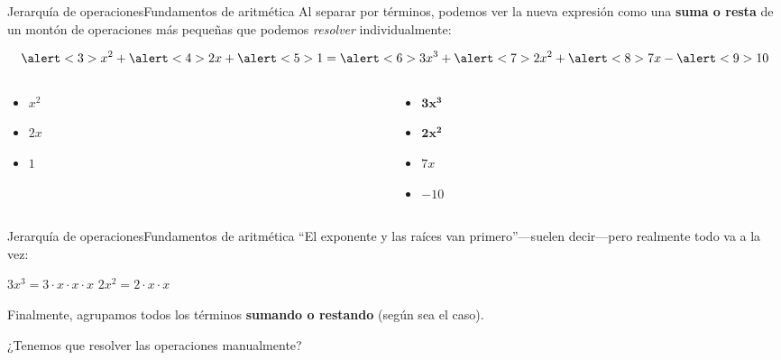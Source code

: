 \documentclass[spanish]{beamer}
\begin{document}
\begin{frame}{Jerarquía de operaciones}{Fundamentos de aritmética}
    Al separar por \alert{términos}, podemos ver la nueva expresión como una \textbf{\color{magenta} suma o resta} de un montón de operaciones más pequeñas que podemos \textit{resolver} individualmente: \pause

    $$\alert<3>{x^2} + \alert<4>{2x} + \alert<5>{1} = \alert<6>{3x^3} + \alert<7>{2x^2} + \alert<8>{7x} - \alert<9>{10}$$ \pause

    \begin{columns}
        \begin{column}{0.5\textwidth}
            \begin{itemize}
                \item<3-> $x^2$
                \item<4-> $2x$
                \item<5-> $1$
            \end{itemize}
        \end{column}
        \begin{column}{0.5\textwidth}
            \begin{itemize}
                \item<6-> $\mathbf{3x^3}$
                \item<7-> $\mathbf{2x^2}$
                \item<8-> $7x$
                \item<9-> $-10$
            \end{itemize}
        \end{column}
    \end{columns}
\end{frame}

\begin{frame}{Jerarquía de operaciones}{Fundamentos de aritmética}
    ``El exponente y las raíces van primero''---suelen decir---pero realmente todo va a la vez: \pause

    \bigskip
    
    \begin{center}
        $3x^3 = 3 \cdot x \cdot x \cdot x$ \pause \hfill $2x^2 = 2 \cdot x \cdot x$
    \end{center} \pause
    
    Finalmente, agrupamos todos los términos \textbf{\color{magenta} sumando o restando} (según sea el caso). \pause

    \bigskip

    \begin{center}
        \Large
        ¿Tenemos que resolver las operaciones manualmente?
    \end{center}
\end{frame}
\end{document}

